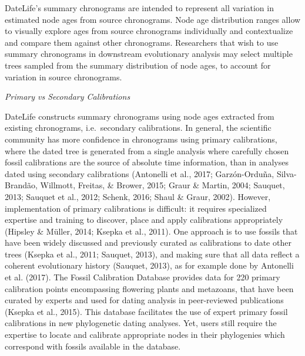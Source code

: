\documentclass[english,man]{apa6}
\begin{document}
DateLife's summary chronograms are intended to represent all variation in estimated node ages from source chronograms. Node age distribution ranges allow to visually explore ages from source chronograms individually and contextualize and compare them against other chronograms. Researchers that wish to use summary chronograms in downstream evolutionary analysis may select multiple trees sampled from the summary distribution of node ages, to account for variation in source chronograms.

\begin{center}
\emph{Primary vs Secondary Calibrations}
\end{center}

DateLife constructs summary chronograms using node ages extracted from existing chronograms, i.e.~secondary calibrations.
In general, the scientific community has more confidence in chronograms using primary calibrations, where the dated tree is generated from a single analysis where carefully chosen fossil calibrations are the source of absolute time information, than in analyses dated using secondary calibrations (Antonelli et al., 2017; Garzón-Orduña, Silva-Brandão, Willmott, Freitas, \& Brower, 2015; Graur \& Martin, 2004; Sauquet, 2013; Sauquet et al., 2012; Schenk, 2016; Shaul \& Graur, 2002).
However, implementation of primary calibrations is difficult: it requires specialized expertise and training to discover, place and apply calibrations appropriately (Hipsley \& Müller, 2014; Ksepka et al., 2011). One approach is to use fossils that have been widely discussed and previously curated as calibrations to date other trees (Ksepka et al., 2011; Sauquet, 2013), and making sure that all data reflect a coherent evolutionary history (Sauquet, 2013), as for example done by Antonelli et al. (2017).
The Fossil Calibration Database provides data for 220 primary calibration points encompassing flowering plants and metazoans, that have been curated by experts and used for dating analysis in peer-reviewed publications (Ksepka et al., 2015). This database facilitates the use of expert primary fossil calibrations in new phylogenetic dating analyses.
Yet, users still require the expertise to locate and calibrate appropriate nodes in their phylogenies which correspond with fossils available in the database.
\end{document}
